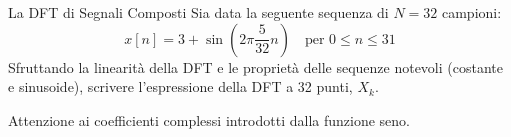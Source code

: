 
\begin{esercizio}{La DFT di Segnali Composti}
    Sia data la seguente sequenza di $N=32$ campioni:
    \[
        x[n] = 3 + \sin\left(2\pi \frac{5}{32} n\right) \quad \text{per } 0 \leq n \leq 31
    \]
    Sfruttando la linearità della DFT e le proprietà delle sequenze notevoli (costante e sinusoide), scrivere l'espressione della DFT a 32 punti, $X_k$.
    
    Attenzione ai coefficienti complessi introdotti dalla funzione seno.
\end{esercizio}